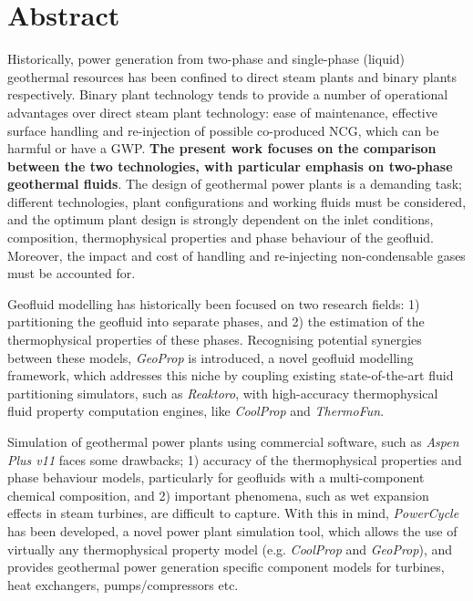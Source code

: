 \chapter*{Abstract} 
Historically, power generation from two-phase and single-phase (liquid) geothermal resources has been confined to direct steam plants and binary plants respectively. Binary plant technology tends to provide a number of operational advantages over direct steam plant technology: ease of maintenance, effective surface handling and re-injection of possible co-produced \acf{NCG}, which can be harmful or have a \ac{GWP}. \textbf{The present work focuses on the comparison between the two technologies, with particular emphasis on two-phase geothermal fluids}. The design of geothermal power plants is a demanding task; different technologies, plant configurations and working fluids must be considered, and the optimum plant design is strongly dependent on the inlet conditions, composition, thermophysical properties and phase behaviour of the geofluid. Moreover, the impact and cost of handling and re-injecting non-condensable gases must be accounted for. 

Geofluid modelling has historically been focused on two research fields: 1) partitioning the geofluid into separate phases, and 2) the estimation of the thermophysical properties of these phases. Recognising potential synergies between these models, \emph{GeoProp} is introduced, a novel geofluid modelling framework, which addresses this niche by coupling existing state-of-the-art fluid partitioning simulators, such as \emph{Reaktoro}, with high-accuracy thermophysical fluid property computation engines, like \emph{CoolProp} and \emph{ThermoFun}.

Simulation of geothermal power plants using commercial software, such as \emph{Aspen Plus v11} faces some drawbacks; 1) accuracy of the thermophysical properties and phase behaviour models, particularly for geofluids with a multi-component chemical composition, and 2) important phenomena, such as wet expansion effects in steam turbines, are difficult to capture. With this in mind, \emph{PowerCycle} has been developed, a novel power plant simulation tool, which allows the use of virtually any thermophysical property model (e.g. \emph{CoolProp} and \emph{GeoProp}), and provides geothermal power generation specific component models for turbines, heat exchangers, pumps/compressors etc. 

